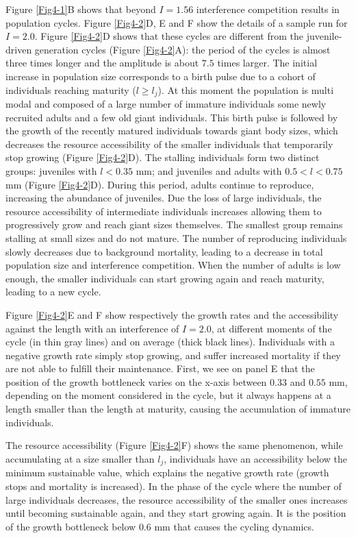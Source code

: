 Figure \ref{Fig4-1}B shows that beyond $I = 1.56$ interference competition
results in population cycles. Figure \ref{Fig4-2}D, E and F show the details of
a sample run for $I=2.0$. Figure \ref{Fig4-2}D shows that these cycles are
different from the juvenile-driven generation cycles (Figure \ref{Fig4-2}A):
the period of the cycles is almost three times longer and the amplitude is about
$7.5$ times larger. The initial increase in population size corresponds to a
birth pulse due to a cohort of individuals reaching maturity ($l \geq l_j$). At
this moment the population is multi modal and composed of a large number of
immature individuals some newly recruited adults and a few old giant
individuals. This birth pulse is followed by the growth of the recently matured
individuals towards giant body sizes, which decreases the resource accessibility
of the smaller individuals that temporarily stop growing (Figure \ref{Fig4-2}D).
The stalling individuals form two distinct groups: juveniles with $l<0.35$ mm;
and juveniles and adults with $0.5 < l < 0.75$ mm (Figure \ref{Fig4-2}D). During
this period, adults continue to reproduce, increasing the abundance of
juveniles. Due the loss of large individuals, the resource accessibility of
intermediate individuals increases allowing them to progressively grow and reach
giant sizes themselves.
The smallest group remains stalling at small sizes and do not mature. The number
of reproducing individuals slowly decreases due to background mortality, leading
to a decrease in total population size and interference competition. When the
number of adults is low enough, the smaller individuals can start growing again
and reach maturity, leading to a new cycle.

Figure \ref{Fig4-2}E and F show respectively the growth rates and the
accessibility against the length with an interference of $I=2.0$, at different
moments of the cycle (in thin gray lines) and on average (thick black lines).
Individuals with a negative growth rate simply stop growing, and suffer
increased mortality if they are not able to fulfill their maintenance. First, we
see on panel E that the position of the growth bottleneck varies on the x-axis
between $0.33$ and $0.55$ mm, depending on the moment considered in the cycle,
but it always happens at a length smaller than the length at maturity, causing
the accumulation of immature individuals.


The resource accessibility (Figure \ref{Fig4-2}F) shows the same phenomenon,
while accumulating at a size smaller than $l_j$, individuals have an
accessibility below the minimum sustainable value, which explains the negative
growth rate (growth stops and mortality is increased). In the phase of the cycle
where the number of large individuals decreases, the resource accessibility of
the smaller ones increases until becoming sustainable again, and they start
growing again. It is the position of the growth bottleneck below $0.6$ mm that
causes the cycling dynamics.

